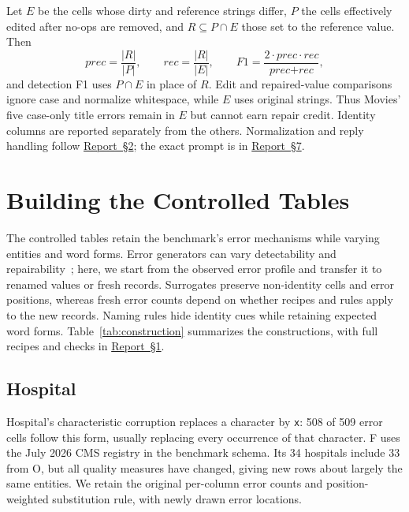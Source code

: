 \documentclass[sigconf, nonacm]{acmart}
\newcommand{\companionref}[1]{\href{https://github.com/hinsonver/CoRe-Benchmark/raw/refs/heads/main/paper/CoRe-Supplementary-Technical-Report.pdf\#nameddest=companion-#1}{Report~\S#1}}
\begin{document}
Let $E$ be the cells whose dirty and reference strings differ, $P$ the cells effectively edited
after no-ops are removed, and $R \subseteq P \cap E$ those set to the reference value. Then
\begin{equation*}
  \textit{prec} = \frac{|R|}{|P|}, \qquad \textit{rec} = \frac{|R|}{|E|}, \qquad
  F1 = \frac{2 \cdot \textit{prec} \cdot \textit{rec}}{\textit{prec} + \textit{rec}},
\end{equation*}
and detection F1 uses $P \cap E$ in place of $R$. Edit and repaired-value comparisons ignore
case and normalize whitespace, while $E$ uses original strings. Thus Movies' five case-only
title errors remain in $E$ but cannot earn repair credit. Identity columns are reported
separately from the others. Normalization and reply handling follow \companionref{2};
the exact prompt is in \companionref{7}.

\section{Building the Controlled Tables}\label{sec:construction}

The controlled tables retain the benchmark's error mechanisms while varying entities and word
forms. Error generators can vary detectability and repairability~\cite{arocena2015bart}; here,
we start from the observed error profile and transfer it to renamed values or fresh records.
Surrogates preserve non-identity cells and error positions, whereas fresh error counts depend
on whether recipes and rules apply to the new records. Naming rules hide identity cues while
retaining expected word forms. Table~\ref{tab:construction}
summarizes the constructions, with full recipes and checks in \companionref{1}.



\subsection{Hospital}\label{sec:build-hospital}

Hospital's characteristic corruption replaces a character by \texttt{x}: 508 of 509 error cells
follow this form, usually replacing every occurrence of that character. F uses the July 2026
CMS registry in the benchmark schema. Its 34 hospitals include 33 from O, but all quality
measures have changed, giving new rows about largely the same entities. We retain the original
per-column error counts and position-weighted substitution rule, with newly drawn error locations.
\end{document}
